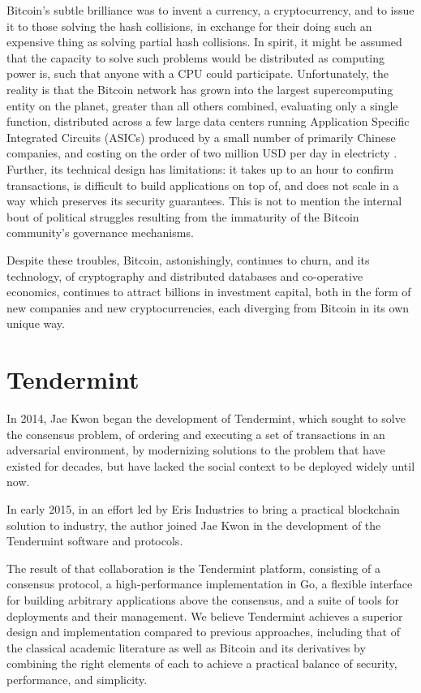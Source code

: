 Bitcoin's subtle brilliance was to invent a currency, a cryptocurrency, and to issue it to those solving the hash collisions, 
in exchange for their doing such an expensive thing as solving partial hash collisions.
In spirit, it might be assumed that the capacity to solve such problems would be distributed as computing power is, 
such that anyone with a CPU could participate.
Unfortunately, the reality is that the Bitcoin network has grown into the largest supercomputing entity on the planet, greater than all others combined,
evaluating only a single function, distributed across a few large data centers running Application Specific Integrated Circuits (ASICs) 
produced by a small number of primarily Chinese companies, 
and costing on the order of two million USD per day in electricty \cite{blockchaininfo}.
Further, its technical design has limitations: it takes up to an hour to confirm transactions, is difficult to build applications on top of, and does not scale in a way which preserves its security guarantees.
This is not to mention the internal bout of political struggles resulting from the immaturity of the Bitcoin community's governance mechanisms.

Despite these troubles, Bitcoin, astonishingly, continues to churn,
and its technology, 
of cryptography and distributed databases and co-operative economics,
continues to attract billions in investment capital,
both in the form of new companies and new cryptocurrencies,
each diverging from Bitcoin in its own unique way.

\section{Tendermint}

In 2014, Jae Kwon began the development of Tendermint, which sought to solve the consensus problem,
of ordering and executing a set of transactions in an adversarial environment, 
by modernizing solutions to the problem that have existed for decades,
but have lacked the social context to be deployed widely until now.

In early 2015, in an effort led by Eris Industries to bring a practical blockchain solution to industry,
the author joined Jae Kwon in the development of the Tendermint software and protocols.

The result of that collaboration is the Tendermint platform, consisting of a consensus protocol, a high-performance implementation in Go,
a flexible interface for building arbitrary applications above the consensus, and a suite of tools for deployments and their management.
We believe Tendermint achieves a superior design and implementation compared to previous approaches, 
including that of the classical academic literature \cite{dls,pbft,raft} as well as Bitcoin \cite{bitcoin} and its derivatives \cite{ethereum,sidechains,peercoin}
by combining the right elements of each to achieve a practical balance of security, performance, and simplicity.

